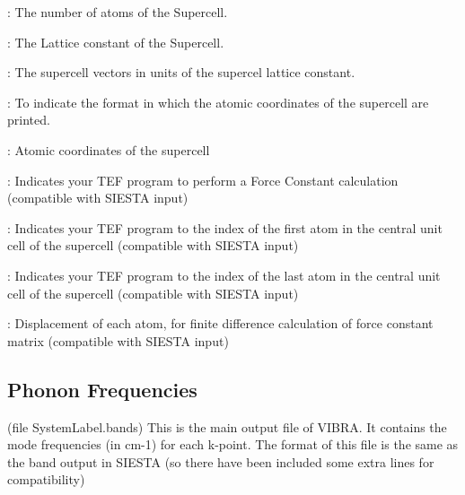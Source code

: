 \begin{description}
\itemsep 10pt
\parsep 0pt

\item[{\bf NumberOfAtoms}]: 
The number of atoms of the Supercell.

\item[{\bf LatticeConstant}]: The Lattice constant
of the Supercell.

\item[{\bf LatticeVectors}]: 
The supercell vectors 
in units of the supercel lattice constant.

\item[{\bf AtomicCoordinatesFormat}]:  To indicate the format
in which the atomic coordinates of the supercell are printed.

\item[{\bf AtomicCoordinatesAndAtomicSpecies}]: Atomic coordinates
of the supercell

\item[{\bf MD.TypeOfRun  FC}]: Indicates your TEF program to
perform a Force Constant calculation (compatible with SIESTA input)

\item[{\bf MD.FCfirst}]: Indicates your TEF program to
the index of the first atom in the central unit cell
of the supercell
(compatible with SIESTA input)

\item[{\bf MD.FClast}]: Indicates your TEF program to
the index of the last atom in the central unit cell
of the supercell
(compatible with SIESTA input)

\item[{\bf MD.FCdispl}]: Displacement of each atom,
for finite difference calculation of force constant matrix
(compatible with SIESTA input)

\end{description}
 
\subsection{Phonon Frequencies}
(file SystemLabel.bands) 
This is the main output file
of VIBRA. It contains the mode frequencies (in cm-1) for each k-point.
The format of this file is the same as the band output in SIESTA
(so there have been included some extra lines for compatibility)

